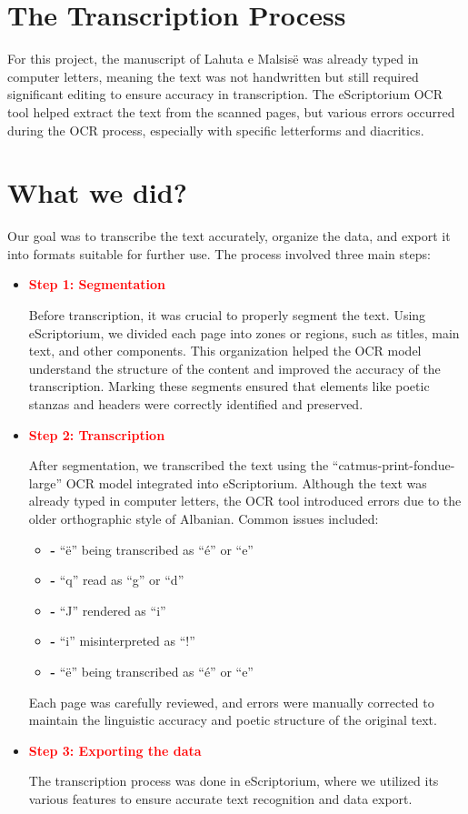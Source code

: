 \documentclass[12pt]{article}
\begin{document}
\section*{The Transcription Process}
For this project, the manuscript of Lahuta e Malsisë was already typed in computer letters, meaning the text was not handwritten but still required significant editing to ensure accuracy in transcription. The eScriptorium OCR tool helped extract the text from the scanned pages, but various errors occurred during the OCR process, especially with specific letterforms and diacritics.

\section*{What we did?}
Our goal was to transcribe the text accurately, organize the data, and export it into formats suitable for further use. The process involved three main steps: 

\begin{itemize}[label=\textcolor{red}{\textbullet}]
    \item \textcolor{red}{\textbf{Step 1: Segmentation}}
    
Before transcription, it was crucial to properly segment the text. Using eScriptorium, we divided each page into zones or regions, such as titles, main text, and other components. This organization helped the OCR model understand the structure of the content and improved the accuracy of the transcription. Marking these segments ensured that elements like poetic stanzas and headers were correctly identified and preserved.

    \item \textcolor{red}{\textbf{Step 2: Transcription}}
    
After segmentation, we transcribed the text using the “catmus-print-fondue-large” OCR model integrated into eScriptorium. Although the text was already typed in computer letters, the OCR tool introduced errors due to the older orthographic style of Albanian. Common issues included:

    \begin{itemize}[label={}]
        \item {\textbf{-} “ë” being transcribed as “é” or “e”}
        \item {\textbf{-} “q” read as “g” or “d”}
        \item {\textbf{-} “J” rendered as “i”}
        \item {\textbf{-} “i” misinterpreted as “!”}
        \item {\textbf{-} “ë” being transcribed as “é” or “e”}
    \end{itemize}
Each page was carefully reviewed, and errors were manually corrected to maintain the linguistic accuracy and poetic structure of the original text.

    \item \textcolor{red}{\textbf{Step 3: Exporting the data}}
    
The transcription process was done in eScriptorium, where we utilized its various features to ensure accurate text recognition and data export.

\end{itemize}
\end{document}
